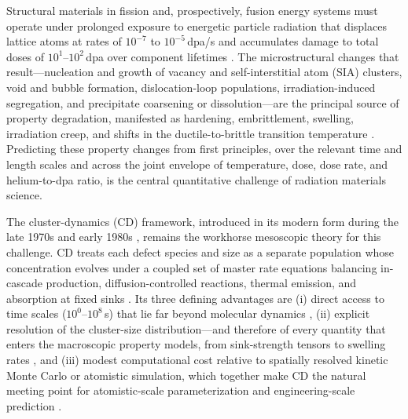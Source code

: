 \documentclass[sn-mathphys-ay,Numbered]{sn-jnl}
\begin{document}
Structural materials in fission and, prospectively, fusion energy
systems must operate under prolonged exposure to energetic particle
radiation that displaces lattice atoms at rates of $10^{-7}$ to
$10^{-5}$\,dpa/s and accumulates damage to total doses of
$10^{1}$--$10^{2}$\,dpa over component lifetimes
\citep{Mansur1994,Zinkle2013,Stork2014}. The microstructural changes
that result---nucleation and growth of vacancy and self-interstitial
atom (SIA) clusters, void and bubble formation, dislocation-loop
populations, irradiation-induced segregation, and precipitate
coarsening or dissolution---are the principal source of property
degradation, manifested as hardening, embrittlement,
swelling, irradiation creep, and shifts in the ductile-to-brittle
transition temperature \citep{Was2017,Odette2008,Yamamoto2020}.
Predicting these property changes from first principles, over the
relevant time and length scales and across the joint envelope of
temperature, dose, dose rate, and helium-to-dpa ratio, is the central
quantitative challenge of radiation materials science.

The cluster-dynamics (CD) framework, introduced in its modern form
during the late 1970s and early 1980s
\citep{Ghoniem1977,Ghoniem1979a,Ghoniem1980,Hayns1976,Kiritani1973},
remains the workhorse mesoscopic theory for this challenge. CD treats
each defect species and size as a separate population whose
concentration evolves under a coupled set of master rate equations
balancing in-cascade production, diffusion-controlled reactions,
thermal emission, and absorption at fixed sinks
\citep{BrailsfordBullough1972,Wiedersich1972,Mansur1978}. Its three
defining advantages are (i) direct access to time scales
($10^{0}$--$10^{8}$\,s) that lie far beyond molecular dynamics
\citep{Bacon2009,Marian2017}, (ii) explicit resolution of the
cluster-size distribution---and therefore of every quantity that
enters the macroscopic property models, from sink-strength tensors to
swelling rates \citep{GolubovSingh2001,Surh2004}, and (iii) modest
computational cost relative to spatially resolved kinetic Monte Carlo
or atomistic simulation, which together make CD the natural meeting
point for atomistic-scale parameterization and engineering-scale
prediction \citep{KohnertWirth2017,Marian2011,Caturla2008}.
\end{document}
